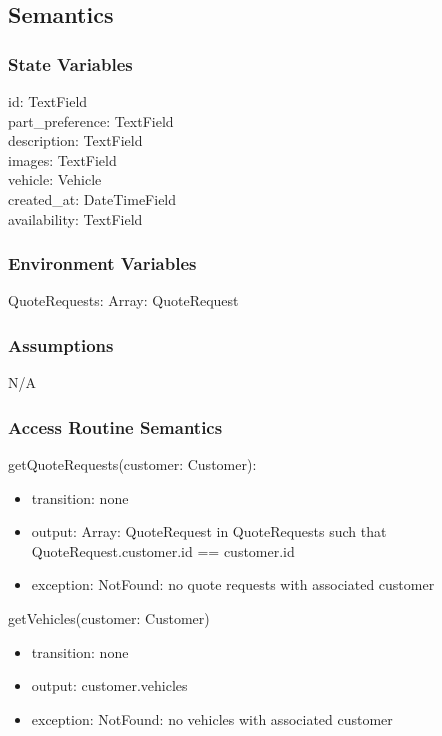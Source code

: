 \documentclass[12pt, titlepage]{article}
\begin{document}
\subsection{Semantics}

\subsubsection{State Variables}

id: TextField \\
part\_preference: TextField \\
description: TextField \\
images: TextField \\
vehicle: Vehicle \\
created\_at: DateTimeField \\
availability: TextField

\subsubsection{Environment Variables}

QuoteRequests: Array: QuoteRequest

\subsubsection{Assumptions}

N/A

\subsubsection{Access Routine Semantics}

\noindent getQuoteRequests(customer: Customer):
\begin{itemize}
    \item transition: none
    \item output: Array: QuoteRequest in QuoteRequests such that QuoteRequest.customer.id == customer.id
    \item exception: NotFound: no quote requests with associated customer
\end{itemize}

\noindent getVehicles(customer: Customer)
\begin{itemize}
    \item transition: none
    \item output: customer.vehicles
    \item exception: NotFound: no vehicles with associated customer
\end{itemize}
\end{document}
